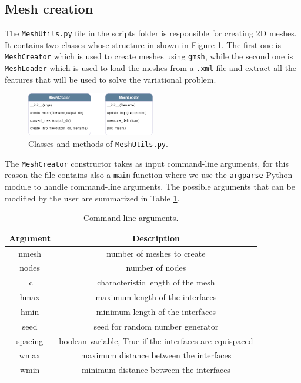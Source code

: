 \documentclass[11pt,a4paper]{article}
\begin{document}
\subsection{Mesh creation}

The \texttt{MeshUtils.py} file in the scripts folder is responsible for creating 2D meshes. It contains two classes whose structure in shown in Figure \ref{mesh_class}. The first one is \texttt{MeshCreator} which is used to create meshes using \texttt{gmsh}, while the second one is  \texttt{MeshLoader} which is used to load the meshes from a \texttt{.xml} file and extract all the features that will be used to solve the variational problem.

\begin{figure}[H]
    \centering
    \includegraphics[width=0.5\textwidth]{Images/mesh_class.png}
    \caption{Classes and methods of \texttt{MeshUtils.py}.}
    \label{mesh_class}
\end{figure}

The \texttt{MeshCreator} constructor takes as input command-line arguments, for this reason the file contains also a \texttt{main} function where we use the \texttt{argparse} Python module to handle command-line arguments. 
The possible arguments that can be modified by the user are summarized in Table \ref{args}.

\begin{table}[H]
    \centering
    \begin{tabular}{|c|c|}
        \hline
        \textbf{Argument} & \textbf{Description} \\
        \hline
        nmesh & number of meshes to create \\
        nodes & number of nodes \\
        lc & characteristic length of the mesh \\
        hmax & maximum length of the interfaces \\
        hmin & minimum length of the interfaces \\
        seed & seed for random number generator \\
        spacing & boolean variable, True if the interfaces are equispaced \\
        wmax & maximum distance between the interfaces \\
        wmin & minimum distance between the interfaces \\
        \hline   
    \end{tabular}
    \caption{Command-line arguments.}
    \label{args}
\end{table}
\end{document}
